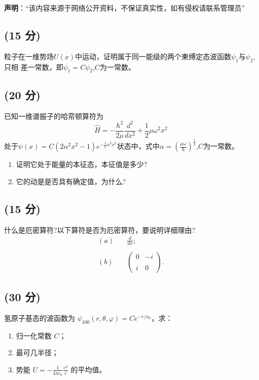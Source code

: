 
\textbf{声明}：“该内容来源于网络公开资料，不保证真实性，如有侵权请联系管理员”

\subsection{(15 分)}
粒子在一维势场$U(x)$中运动，证明属于同一能级的两个東缚定态波函数$\psi_1$与$\psi_2$,只相
差一常数，即$\psi_1=C\psi_2$,$C$为一常数。
\subsection{(20 分)}
已知一维谱振子的哈帟顿算符为$$\hat{H} = -\frac{\hbar^2}{2\mu} \frac{d^2}{dx^2} + \frac{1}{2}\mu \omega^2 x^2~$$处于$\psi(x) = C(2\alpha^2x^2 - 1)e^{-\frac{1}{2}\alpha^2x^2}$状态中，式中$\alpha = \left( \frac{\mu \omega}{\hbar} \right)^{\frac{1}{2}}$,$C$为一常数。
\begin{enumerate}
\item 证明它处于能量的本征态，本征值是多少?
\item 它的动是是否具有确定值，为什么?
\end{enumerate}
\subsection{(15 分)}
什么是厄密算符?以下算符是否为厄密算符，要说明详细理由?
\begin{equation}
\begin{aligned}
(a) & \quad \frac{d}{dx}; \\\\
(b) & \quad \begin{pmatrix}
0 & -i \\\\
i & 0
\end{pmatrix}.
\end{aligned}~
\end{equation}
\subsection{(30 分)}
 氢原子基态的波函数为 $\psi_{100}(r, \theta, \varphi) = Ce^{-r/a_0}$，求：
 \begin{enumerate}
 \item 归一化常数 $C$；
 \item 最可几半径；
 \item 势能 $U = -\frac{1}{4 \pi \epsilon_0} \frac{e^2}{r}$ 的平均值。
 \end{enumerate}
